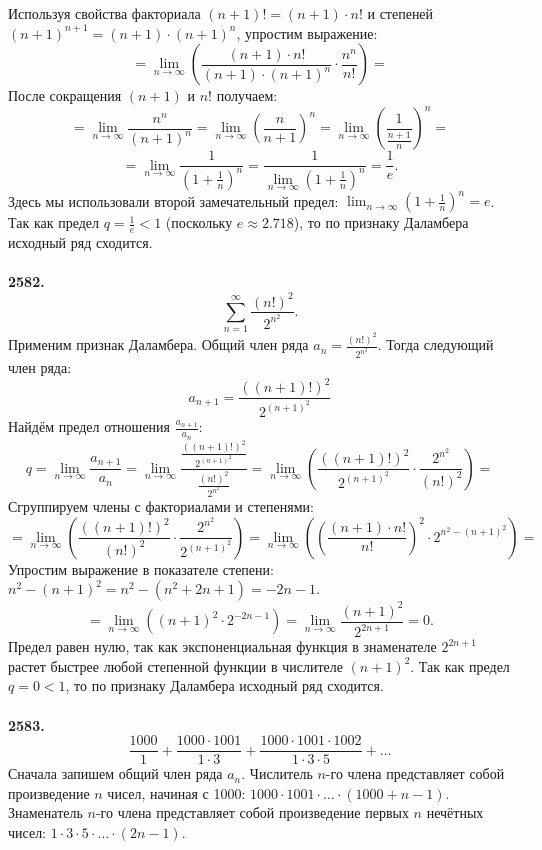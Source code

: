 \documentclass[a4paper, 12pt]{report}
\numberwithin{equation}{section}
\begin{document}
	Используя свойства факториала $(n+1)! = (n+1) \cdot n!$ и степеней $(n+1)^{n+1} = (n+1) \cdot (n+1)^n$, упростим выражение:
	$$ = \lim_{n \to \infty} \left( \frac{(n+1) \cdot n!}{(n+1) \cdot (n+1)^n} \cdot \frac{n^n}{n!} \right) = $$
	После сокращения $(n+1)$ и $n!$ получаем:
	$$ = \lim_{n \to \infty} \frac{n^n}{(n+1)^n} = \lim_{n \to \infty} \left(\frac{n}{n+1}\right)^n = \lim_{n \to \infty} \left(\frac{1}{\frac{n+1}{n}}\right)^n = $$
	$$ = \lim_{n \to \infty} \frac{1}{\left(1+\frac{1}{n}\right)^n} = \frac{1}{\lim_{n \to \infty} \left(1+\frac{1}{n}\right)^n} = \frac{1}{e}. $$
	Здесь мы использовали второй замечательный предел: $\lim_{n \to \infty} \left(1+\frac{1}{n}\right)^n = e$.
	Так как предел $q = \frac{1}{e} < 1$ (поскольку $e \approx 2.718$), то по признаку Даламбера исходный ряд сходится.
	\\\\
	\textbf{2582.}
	$$\sum_{n=1}^{\infty} \frac{(n!)^2}{2^{n^2}}.$$
	Применим признак Даламбера.
	Общий член ряда $a_n = \frac{(n!)^2}{2^{n^2}}$.
	Тогда следующий член ряда:
	$$ a_{n+1} = \frac{((n+1)!)^2}{2^{(n+1)^2}} $$
	Найдём предел отношения $\frac{a_{n+1}}{a_n}$:
	$$ q = \lim_{n \to \infty} \frac{a_{n+1}}{a_n} = \lim_{n \to \infty} \frac{\frac{((n+1)!)^2}{2^{(n+1)^2}}}{\frac{(n!)^2}{2^{n^2}}} = \lim_{n \to \infty} \left( \frac{((n+1)!)^2}{2^{(n+1)^2}} \cdot \frac{2^{n^2}}{(n!)^2} \right) = $$
	Сгруппируем члены с факториалами и степенями:
	$$ = \lim_{n \to \infty} \left( \frac{((n+1)!)^2}{(n!)^2} \cdot \frac{2^{n^2}}{2^{(n+1)^2}} \right) = \lim_{n \to \infty} \left( \left(\frac{(n+1) \cdot n!}{n!}\right)^2 \cdot 2^{n^2 - (n+1)^2} \right) = $$
	Упростим выражение в показателе степени: $n^2 - (n+1)^2 = n^2 - (n^2 + 2n + 1) = -2n - 1$.
	$$ = \lim_{n \to \infty} \left( (n+1)^2 \cdot 2^{-2n-1} \right) = \lim_{n \to \infty} \frac{(n+1)^2}{2^{2n+1}} = 0. $$
	Предел равен нулю, так как экспоненциальная функция в знаменателе $2^{2n+1}$ растет быстрее любой степенной функции в числителе $(n+1)^2$.
	Так как предел $q = 0 < 1$, то по признаку Даламбера исходный ряд сходится.
	\\\\
	\textbf{2583.}
	$$ \frac{1000}{1} + \frac{1000 \cdot 1001}{1 \cdot 3} + \frac{1000 \cdot 1001 \cdot 1002}{1 \cdot 3 \cdot 5} + \dots $$
	Сначала запишем общий член ряда $a_n$.
	Числитель $n$-го члена представляет собой произведение $n$ чисел, начиная с 1000: $1000 \cdot 1001 \cdot \dots \cdot (1000 + n - 1)$.
	Знаменатель $n$-го члена представляет собой произведение первых $n$ нечётных чисел: $1 \cdot 3 \cdot 5 \cdot \dots \cdot (2n-1)$.
\end{document}
